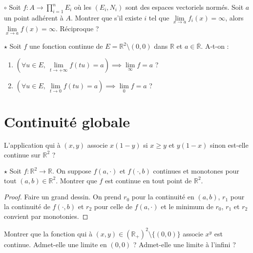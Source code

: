 \documentclass[french,a4paper]{article}
\newcommand{\R}{\mathbb{R}}
\theoremstyle{plain}
\theoremstyle{definition}
\theoremstyle{remark}
\begin{document}
\begin{ex}{$\circ$}
	Soit $f:A\to\displaystyle\prod_{i=1}^{n}E_i$ où les $(E_i,N_i)$ sont des espaces vectoriels normés. Soit $a$ un point adhérent à $A$. Montrer que s'il existe $i$ tel que $\underset{x\to a}{\lim} f_i(x)=\infty$, alors $\underset{x\to a}{\lim} f(x)=\infty$. Réciproque ?
\end{ex}

\begin{ex}{$\star$}
	Soit $f$ une fonction continue de $E=\R^2\setminus{(0,0)}$ dans $\R$ et $a\in\overline{\R}$. A-t-on :
	\begin{enumerate}
		\item $\left(\forall u\in E,\ \underset{t\to+\infty}{\lim}f(tu)=a\right)\implies \underset{\infty}{\lim} f=a$ ?
		\item $\left(\forall u\in E,\ \underset{t\to0}{\lim}f(tu)=a\right)\implies \underset{0}{\lim} f=a$ ?
	\end{enumerate}
\end{ex}

\section{Continuité globale}

\begin{ex}{}
	L'application qui à $(x,y)$ associe $x(1-y)$ si $x\geqslant y$ et $y(1-x)$ sinon est-elle continue sur $\R^2$ ?
\end{ex}

\begin{ex}{$\star$}
	Soit $f:\R^2\to\R$. On suppose $f(a,\cdot)$ et $f(\cdot,b)$ continues et monotones pour tout $(a,b)\in\R^2$. Montrer que $f$ est continue en tout point de $\R^2$.
\end{ex}
\begin{proof}
	Faire un grand dessin. On prend $r_0$ pour la continuité en $(a,b)$, $r_1$ pour la continuité de $f(\cdot,b)$ et $r_2$ pour celle de $f(a,\cdot)$ et le minimum de $r_0$, $r_1$ et $r_2$ convient par monotonies.
\end{proof}

\begin{ex}{}
	Montrer que la fonction qui à $(x,y)\in(\R_+)^2\setminus\{(0,0)\}$ associe $x^y$ est continue. Admet-elle une limite en $(0,0)$ ? Admet-elle une limite à l'infini ?
\end{ex}
\end{document}
